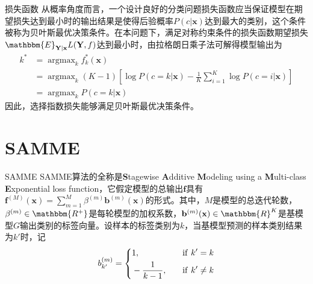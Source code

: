 \documentclass{ctexbeamer}        %
\begin{document}
\begin{frame}{损失函数}
从概率角度而言，一个设计良好的分类问题损失函数应当保证模型在期望损失达到最小时的输出结果是使得后验概率$P(c\vert \mathbf{x})$达到最大的类别，这个条件被称为贝叶斯最优决策条件。在本问题下，满足对称约束条件的损失函数期望损失$\mathbbm{E}_{\mathbf{Y}\vert\mathbf{x}}L(\mathbf{Y},f)$达到最小时，由拉格朗日乘子法可解得模型输出为
\begin{align*}
k^* & =\mathop{\arg\max}_kf_k^*(\mathbf{x})\\
& =\mathop{\arg\max}_k (K-1)[\log P(c=k\vert \mathbf{x})-\frac{1}{K}\sum_{i=1}^K\log P(c=i\vert \mathbf{x})] \\
& =\mathop{\arg\max}_k P(c=k\vert \mathbf{x})
\end{align*}
因此，选择指数损失能够满足贝叶斯最优决策条件。
\end{frame}
\section{SAMME}
\begin{frame}{SAMME}
SAMME算法的全称是\textbf{S}tagewise \textbf{A}dditive \textbf{M}odeling using a \textbf{M}ulti-class \textbf{E}xponential loss function，它假定模型的总输出$\mathbf{f}$具有$\mathbf{f}^{(M)}(\mathbf{x})=\sum_{m=1}^M \beta^{(m)} \mathbf{b}^{(m)}(\mathbf{x})$的形式。其中，$M$是模型的总迭代轮数，$\beta^{(m)}\in \mathbbm{R^+}$是每轮模型的加权系数，$\mathbf{b}^{(m)}(\mathbf{x}) \in\mathbbm{R}^K$是基模型$G$输出类别的标签向量。设样本的标签类别为$k$，当基模型预测的样本类别结果为$k'$时，记
\begin{equation}
\notag
b^{(m)}_{k'}=\left\{
\begin{aligned}
&1,\quad &{\rm if}\ k'=k\\
&-\frac{1}{k-1},\quad &{\rm if}\ k'\neq k
\end{aligned}
\right.
\end{equation}
\end{frame}
\end{document}
